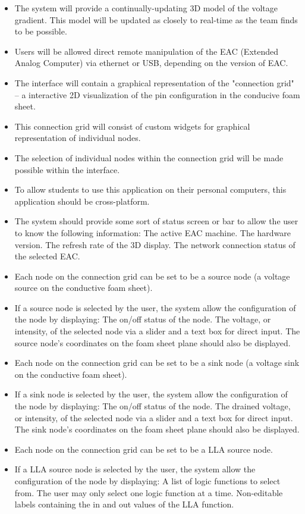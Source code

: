 \begin{itemize}
\item The system will provide a continually-updating 3D model of the voltage gradient.  This model will be updated as closely to real-time as the team finds to be possible.
\item Users will be allowed direct remote manipulation of the EAC (Extended Analog Computer) via ethernet or USB, depending on the version of EAC.
\item The interface will contain a graphical representation of the "connection grid" -- a interactive 2D visualization of the pin configuration in the conducive foam sheet.
\item This connection grid will consist of custom widgets for graphical representation of individual nodes.
\item The selection of individual nodes within the connection grid will be made possible within the interface.
\item To allow students to use this application on their personal computers, this application should be cross-platform.
\item The system should provide some sort of status screen or bar to allow the user to know the following information:
\subitem The active EAC machine.
\subitem The hardware version.
\subitem The refresh rate of the 3D display.
\subitem The network connection status of the selected EAC.
\item Each node on the connection grid can be set to be a source node (a voltage source on the conductive foam sheet).
\item If a source node is selected by the user, the system allow the configuration of the node by displaying:
\subitem The on/off status of the node.
\subitem The voltage, or intensity, of the selected node via a slider and a text box for direct input.
\subitem The source node's coordinates on the foam sheet plane should also be displayed.
\item Each node on the connection grid can be set to be a sink node (a voltage sink on the conductive foam sheet).
\item If a sink node is selected by the user, the system allow the configuration of the node by displaying:
\subitem The on/off status of the node.
\subitem The drained voltage, or intensity, of the selected node via a slider and a text box for direct input.
\subitem The sink node's coordinates on the foam sheet plane should also be displayed.
\item Each node on the connection grid can be set to be a LLA source node.
\item If a LLA source node is selected by the user, the system allow the configuration of the node by displaying:
\subitem A list of logic functions to select from.  The user may only select one logic function at a time.
\subitem Non-editable labels containing the in and out values of the LLA function.
\end{itemize}

